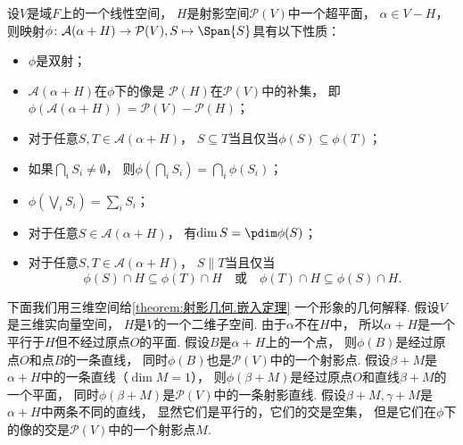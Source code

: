 \begin{theorem}\label{theorem:射影几何.嵌入定理}
设\(V\)是域\(F\)上的一个线性空间，
\(H\)是射影空间\(\mathcal{P}(V)\)中一个超平面，
\(\alpha \in V - H\)，
则映射\(
	\phi\colon \mathcal{A}(\alpha + H) \to \mathcal{P}(V),
	S \mapsto \Span\{S\}
\)具有以下性质：\begin{itemize}
	\item \(\phi\)是双射；

	\item \(\mathcal{A}(\alpha + H)\)在\(\phi\)下的像是
	\(\mathcal{P}(H)\)在\(\mathcal{P}(V)\)中的补集，
	即\(\phi(\mathcal{A}(\alpha + H)) = \mathcal{P}(V) - \mathcal{P}(H)\)；

	\item 对于任意\(S,T \in \mathcal{A}(\alpha + H)\)，
	\(S \subseteq T\)当且仅当\(\phi(S) \subseteq \phi(T)\)；

	\item 如果\(\bigcap_i S_i \neq \emptyset\)，
	则\(\phi\left( \bigcap_i S_i \right) = \bigcap_i \phi(S_i)\)；

	\item \(\phi\left( \bigvee_i S_i \right) = \sum_i S_i\)；

	\item 对于任意\(S \in \mathcal{A}(\alpha + H)\)，
	有\(\dim S = \pdim \phi(S)\)；

	\item 对于任意\(S,T \in \mathcal{A}(\alpha + H)\)，
	\(S \parallel T\)当且仅当\begin{equation*}
		\phi(S) \cap H \subseteq \phi(T) \cap H
		\quad\text{或}\quad
		\phi(T) \cap H \subseteq \phi(S) \cap H.
	\end{equation*}
\end{itemize}
\end{theorem}
\begin{remark}
下面我们用三维空间给\cref{theorem:射影几何.嵌入定理} 一个形象的几何解释.
假设\(V\)是三维实向量空间，
\(H\)是\(V\)的一个二维子空间.
由于\(\alpha\)不在\(H\)中，
所以\(\alpha + H\)是一个平行于\(H\)但不经过原点\(O\)的平面.
假设\(B\)是\(\alpha + H\)上的一个点，
则\(\phi(B)\)是经过原点\(O\)和点\(B\)的一条直线，
同时\(\phi(B)\)也是\(\mathcal{P}(V)\)中的一个射影点.
假设\(\beta + M\)是\(\alpha + H\)中的一条直线（\(\dim M = 1\)），
则\(\phi(\beta + M)\)是经过原点\(O\)和直线\(\beta + M\)的一个平面，
同时\(\phi(\beta + M)\)是\(\mathcal{P}(V)\)中的一条射影直线.
假设\(\beta + M, \gamma + M\)是\(\alpha + H\)中两条不同的直线，
显然它们是平行的，它们的交是空集，
但是它们在\(\phi\)下的像的交是\(\mathcal{P}(V)\)中的一个射影点\(M\).
\end{remark}
